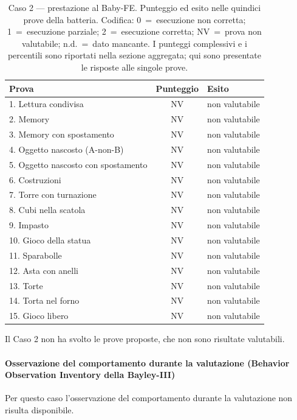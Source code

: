 \begin{table}[htbp]
\centering
\caption[Caso 2 --- prestazione al Baby-FE]{Caso 2 --- prestazione al Baby-FE. Punteggio ed esito nelle quindici prove della batteria. Codifica: 0~=~esecuzione non corretta; 1~=~esecuzione parziale; 2~=~esecuzione corretta; NV~=~prova non valutabile; n.d.~=~dato mancante. I punteggi complessivi e i percentili sono riportati nella sezione aggregata; qui sono presentate le risposte alle singole prove.}
\label{tab:caso2_prove}
\begin{tabular}{|l|c|l|}
\toprule
\textbf{Prova} & \textbf{Punteggio} & \textbf{Esito} \\
\midrule
1. Lettura condivisa & NV & non valutabile \\
2. Memory & NV & non valutabile \\
3. Memory con spostamento & NV & non valutabile \\
4. Oggetto nascosto (A-non-B) & NV & non valutabile \\
5. Oggetto nascosto con spostamento & NV & non valutabile \\
6. Costruzioni & NV & non valutabile \\
7. Torre con turnazione & NV & non valutabile \\
8. Cubi nella scatola & NV & non valutabile \\
9. Impasto & NV & non valutabile \\
10. Gioco della statua & NV & non valutabile \\
11. Sparabolle & NV & non valutabile \\
12. Asta con anelli & NV & non valutabile \\
13. Torte & NV & non valutabile \\
14. Torta nel forno & NV & non valutabile \\
15. Gioco libero & NV & non valutabile \\
\bottomrule
\end{tabular}
\end{table}

Il Caso 2 non ha svolto le prove proposte, che non sono risultate valutabili.

 \paragraph*{Osservazione del comportamento durante la valutazione (Behavior Observation Inventory della Bayley-III)}

Per questo caso l'osservazione del comportamento durante la valutazione non risulta disponibile.

